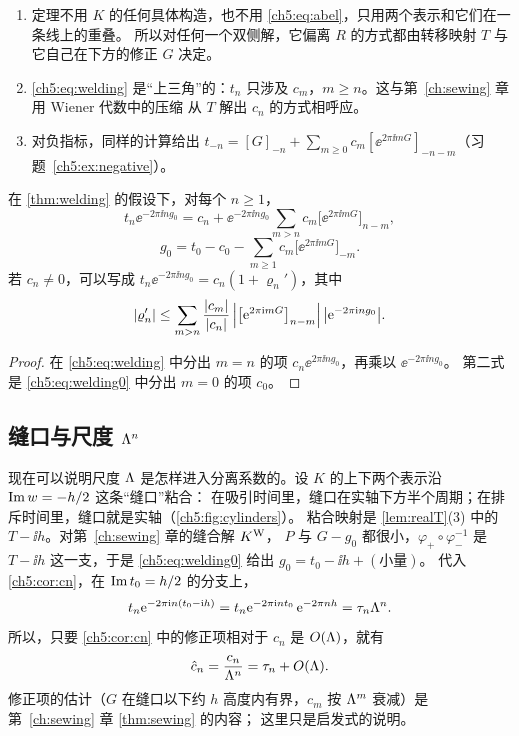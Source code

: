 \begin{remark}\label{ch5:rem:welding}
\begin{enumerate}
\item 定理不用 $K$ 的任何具体构造，也不用 \eqref{ch5:eq:abel}，只用两个表示和它们在一条线上的重叠。
  所以对任何一个双侧解，它偏离 $R$ 的方式都由转移映射 $T$ 与它自己在下方的修正 $G$ 决定。
\item \eqref{ch5:eq:welding} 是``上三角''的：$t_n$ 只涉及 $c_m$，$m\ge n$。这与第~\ref{ch:sewing} 章用 Wiener 代数中的压缩
  从 $T$ 解出 $c_n$ 的方式相呼应。
\item 对负指标，同样的计算给出 $t_{-n}=[G]_{-n}+\sum_{m\ge0}c_m[\ee^{2\pi\ii mG}]_{-n-m}$（习题~\ref{ch5:ex:negative}）。
\end{enumerate}
\end{remark}

\begin{corollary}[用 $\tau_n$ 表示 $c_n$]\label{ch5:cor:cn}
在 \cref{thm:welding} 的假设下，对每个 $n\ge1$，
\[
 t_n\ee^{-2\pi\ii ng_0}=c_n+\ee^{-2\pi\ii ng_0}\sum_{m>n}c_m\bigl[\ee^{2\pi\ii mG}\bigr]_{n-m},
\]
\[
 g_0=t_0-c_0-\sum_{m\ge1}c_m\bigl[\ee^{2\pi\ii mG}\bigr]_{-m}.
\]
若 $c_n\ne0$，可以写成 $t_n\ee^{-2\pi\ii ng_0}=c_n(1+\varrho_n')$，其中
\[
 |\varrho_n'|\le\sum_{m>n}\frac{|c_m|}{|c_n|}\,\Bigl|\bigl[\mathrm{e}^{2\pi\mathrm{i} mG}\bigr]_{n-m}\Bigr|\,\bigl|\mathrm{e}^{-2\pi\mathrm{i} ng_0}\bigr|.
\]
\end{corollary}

\begin{proof}
在 \eqref{ch5:eq:welding} 中分出 $m=n$ 的项 $c_n\ee^{2\pi\ii ng_0}$，再乘以 $\ee^{-2\pi\ii ng_0}$。
第二式是 \eqref{ch5:eq:welding0} 中分出 $m=0$ 的项 $c_0$。
\end{proof}

\subsection{缝口与尺度 $\Lambda^n$}

现在可以说明尺度 $\Lambda$ 是怎样进入分离系数的。设 $K$ 的上下两个表示沿 $\operatorname{Im} w=-h/2$ 这条``缝口''粘合：
在吸引时间里，缝口在实轴下方半个周期；在排斥时间里，缝口就是实轴（\cref{ch5:fig:cylinders}）。
粘合映射是 \cref{lem:realT}(3) 中的 $T-\ii h$。对第~\ref{ch:sewing} 章的缝合解 $K^{\mathrm W}$，
$P$ 与 $G-g_0$ 都很小，$\varphi_+\circ\varphi_-^{-1}$ 是 $T-\ii h$ 这一支，于是 \eqref{ch5:eq:welding0} 给出 $g_0=t_0-\ii h+(\text{小量})$。
代入 \cref{ch5:cor:cn}，在 $\operatorname{Im} t_0=h/2$ 的分支上，
\[
 t_n\mathrm{e}^{-2\pi\mathrm{i} n(t_0-\mathrm{i} h)}=t_n\mathrm{e}^{-2\pi\mathrm{i} nt_0}\,\mathrm{e}^{-2\pi nh}=\tau_n\Lambda^n .
\]
所以，只要 \cref{ch5:cor:cn} 中的修正项相对于 $c_n$ 是 $O(\Lambda)$，就有
\begin{equation}\label{ch5:eq:chat-tau}
 \hat c_n=\frac{c_n}{\Lambda^n}=\tau_n+O(\Lambda).
\end{equation}
修正项的估计（$G$ 在缝口以下约 $h$ 高度内有界，$c_m$ 按 $\Lambda^m$ 衰减）是第~\ref{ch:sewing} 章 \cref{thm:sewing} 的内容；
这里只是启发式的说明。

